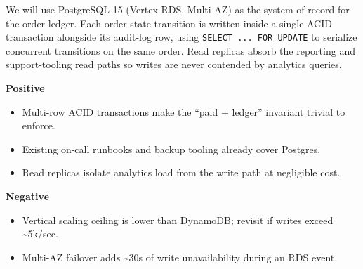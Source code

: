 \documentclass[10pt]{article}
\begin{document}
\begin{decbox}
We will use PostgreSQL 15 (Vertex RDS, Multi-AZ) as the system of record for the order ledger. Each order-state transition is written inside a single ACID transaction alongside its audit-log row, using \texttt{SELECT ... FOR UPDATE} to serialize concurrent transitions on the same order. Read replicas absorb the reporting and support-tooling read paths so writes are never contended by analytics queries.
\end{decbox}

\begin{consbox}
\noindent
\begin{minipage}[t]{0.48\linewidth}
\textbf{\textcolor{adrgreen}{Positive}}
\begin{itemize}
\item[\textcolor{adrgreen}{\faCheckCircle}] Multi-row ACID transactions make the ``paid + ledger'' invariant trivial to enforce.
\item[\textcolor{adrgreen}{\faCheckCircle}] Existing on-call runbooks and backup tooling already cover Postgres.
\item[\textcolor{adrgreen}{\faCheckCircle}] Read replicas isolate analytics load from the write path at negligible cost.
\end{itemize}
\end{minipage}\hfill
\begin{minipage}[t]{0.48\linewidth}
\textbf{\textcolor{adrred}{Negative}}
\begin{itemize}
\item[\textcolor{adrred}{\faTimesCircle}] Vertical scaling ceiling is lower than DynamoDB; revisit if writes exceed \textasciitilde5k/sec.
\item[\textcolor{adrred}{\faTimesCircle}] Multi-AZ failover adds \textasciitilde30s of write unavailability during an RDS event.
\end{itemize}
\end{minipage}
\end{consbox}
\end{document}
